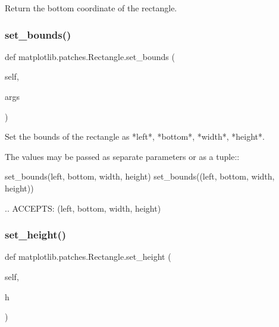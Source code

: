 \begin{DoxyVerb}Return the bottom coordinate of the rectangle.\end{DoxyVerb}
 \mbox{\label{classmatplotlib_1_1patches_1_1Rectangle_aea102be3007ac4f09548b7714d7dd461}} 
\subsubsection{\texorpdfstring{set\+\_\+bounds()}{set\_bounds()}}
{\footnotesize\ttfamily def matplotlib.\+patches.\+Rectangle.\+set\+\_\+bounds (\begin{DoxyParamCaption}\item[{}]{self,  }\item[{}]{args }\end{DoxyParamCaption})}

\begin{DoxyVerb}Set the bounds of the rectangle as *left*, *bottom*, *width*, *height*.

The values may be passed as separate parameters or as a tuple::

    set_bounds(left, bottom, width, height)
    set_bounds((left, bottom, width, height))

.. ACCEPTS: (left, bottom, width, height)
\end{DoxyVerb}
 \mbox{\label{classmatplotlib_1_1patches_1_1Rectangle_adbb43e91e339e31fe0aa6821e15c9b4b}} 
\subsubsection{\texorpdfstring{set\+\_\+height()}{set\_height()}}
{\footnotesize\ttfamily def matplotlib.\+patches.\+Rectangle.\+set\+\_\+height (\begin{DoxyParamCaption}\item[{}]{self,  }\item[{}]{h }\end{DoxyParamCaption})}

